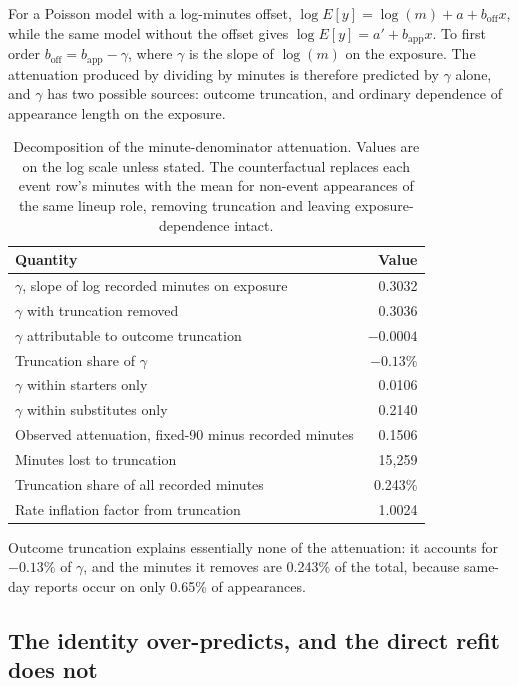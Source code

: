 \documentclass[11pt]{article}
\begin{document}
For a Poisson model with a log-minutes offset, $\log E[y]=\log(m)+a+b_{\text{off}}x$, while the same model without the offset gives $\log E[y]=a'+b_{\text{app}}x$. To first order $b_{\text{off}}=b_{\text{app}}-\gamma$, where $\gamma$ is the slope of $\log(m)$ on the exposure. The attenuation produced by dividing by minutes is therefore predicted by $\gamma$ alone, and $\gamma$ has two possible sources: outcome truncation, and ordinary dependence of appearance length on the exposure.

\begin{table}[h]
\centering
\caption{Decomposition of the minute-denominator attenuation. Values are on the log scale unless stated. The counterfactual replaces each event row's minutes with the mean for non-event appearances of the same lineup role, removing truncation and leaving exposure-dependence intact.}
\label{tab:supp_attenuation}
\small
\begin{tabular}{lr}
\toprule
Quantity & Value\\
\midrule
$\gamma$, slope of log recorded minutes on exposure & 0.3032\\
$\gamma$ with truncation removed & 0.3036\\
$\gamma$ attributable to outcome truncation & $-0.0004$\\
Truncation share of $\gamma$ & $-0.13\%$\\
$\gamma$ within starters only & 0.0106\\
$\gamma$ within substitutes only & 0.2140\\
Observed attenuation, fixed-90 minus recorded minutes & 0.1506\\
Minutes lost to truncation & 15,259\\
Truncation share of all recorded minutes & 0.243\%\\
Rate inflation factor from truncation & 1.0024\\
\bottomrule
\end{tabular}
\end{table}

Outcome truncation explains essentially none of the attenuation: it accounts for $-0.13\%$ of $\gamma$, and the minutes it removes are 0.243\% of the total, because same-day reports occur on only 0.65\% of appearances.

\subsection*{The identity over-predicts, and the direct refit does not}
\end{document}
